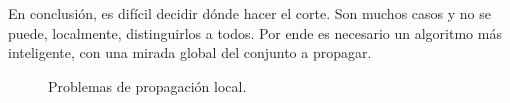 En conclusión, es difícil decidir dónde hacer el corte. Son muchos casos y no se puede, localmente, distinguirlos a todos. Por ende es necesario un algoritmo más inteligente, con una mirada global del conjunto a propagar.
\begin{figure}[htb]
	\centering
	\caption{Problemas de propagación local.}
	\label{fig:propagacionLocal}
\end{figure}

